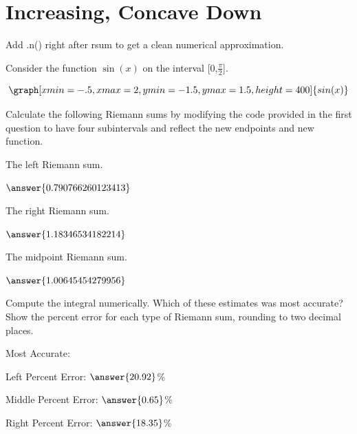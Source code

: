 \documentclass{ximera}
\begin{document}
\section{Increasing, Concave Down}
\begin{question}
\begin{hint}
Add .n() right after rsum to get a clean numerical approximation.
\end{hint}
Consider the function $\sin(x)$ on the interval [0,$\frac{\pi}{2}$].

\[
\graph[xmin=-.5,xmax=2,ymin=-1.5,ymax=1.5,height=400]{sin(x)}
\]

Calculate the following Riemann sums by modifying the code provided in the first question to have four subintervals and reflect the new endpoints and new function.

The left Riemann sum.

\begin{onlineOnly}
\begin{sageCell}

\end{sageCell}
\end{onlineOnly}

$\answer{0.790766260123413}$

The right Riemann sum.

\begin{onlineOnly}
\begin{sageCell}

\end{sageCell}
\end{onlineOnly}

$\answer{1.18346534182214}$

The midpoint Riemann sum.

\begin{onlineOnly}
\begin{sageCell}

\end{sageCell}
\end{onlineOnly}

$\answer{1.00645454279956}$

Compute the integral numerically. Which of these estimates was most accurate? Show the percent error for each type of Riemann sum, rounding to two decimal places.

\begin{onlineOnly}
\begin{sageCell}

\end{sageCell}
\end{onlineOnly}

Most Accurate:
\begin{multipleChoice}
\end{multipleChoice}

Left Percent Error: $\answer{20.92}$\%

Middle Percent Error: $\answer{0.65}$\%

Right Percent Error: $\answer{18.35}$\%
\end{question}
\end{document}
